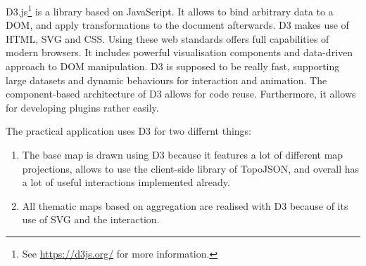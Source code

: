 D3.js\footnote{See \href{https://d3js.org/}{https://d3js.org/} for more information.} is a library based on JavaScript. It allows to bind arbitrary data to a \ac{DOM}, and apply transformations to the document afterwards. \ac{D3} makes use of \ac{HTML}, \ac{SVG} and \ac{CSS}. Using these web standards offers full capabilities of modern browsers. It includes powerful visualisation components and data-driven approach to \ac{DOM} manipulation. \ac{D3} is supposed to be really fast, supporting large datasets and dynamic behaviours for interaction and animation. The component-based architecture of \ac{D3} allows for code reuse. Furthermore, it allows for developing plugins rather easily.

The practical application uses \ac{D3} for two differnt things:
\begin{enumerate}
\item The base map is drawn using \ac{D3} because it features a lot of different map projections, allows to use the client-side library of TopoJSON, and overall has a lot of useful interactions implemented already.
\item All thematic maps based on aggregation are realised with \ac{D3} because of its use of \ac{SVG} and the interaction.
\end{enumerate}